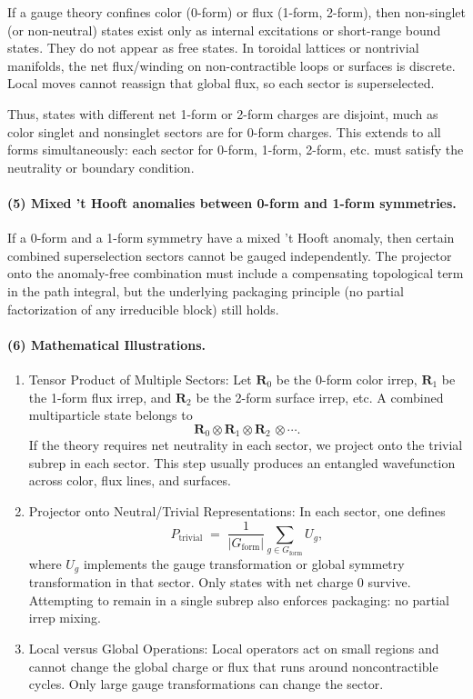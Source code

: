\documentclass[12pt,a4paper]{article}
\begin{document}
If a gauge theory confines color (0-form) or flux (1-form, 2-form),
then non-singlet (or non-neutral) states exist only as internal excitations or short-range bound states.
They do not appear as free states.
In toroidal lattices or nontrivial manifolds, the net flux/winding on non-contractible loops or surfaces is discrete.
Local moves cannot reassign that global flux, so each sector is superselected.

Thus, states with different net 1-form or 2-form charges are disjoint, much as color singlet and nonsinglet sectors are for 0-form charges.
This extends to all forms simultaneously:
each sector for 0-form, 1-form, 2-form, etc. must satisfy the neutrality or boundary condition.


\paragraph{(5) Mixed ’t Hooft anomalies between 0-form and 1-form symmetries.}
If a 0-form and a 1-form symmetry have a mixed ’t Hooft anomaly, then certain combined superselection sectors cannot be gauged independently.
The projector onto the anomaly-free combination must include a compensating topological term in the path integral, but the underlying packaging principle (no partial factorization of any irreducible block) still holds.


\paragraph{(6) Mathematical Illustrations.}

\begin{enumerate}
	\item Tensor Product of Multiple Sectors:  
	Let $\mathbf{R}_0$ be the 0-form color irrep, 
	$\mathbf{R}_1$ be the 1-form flux irrep, 
	and $\mathbf{R}_2$ be the 2-form surface irrep, etc.
	A combined multiparticle state belongs to	
	\[
	\mathbf{R}_{0}\otimes\mathbf{R}_{1}\otimes\mathbf{R}_{2}\,\otimes\cdots.
	\]
	If the theory requires net neutrality in each sector, we project onto the trivial subrep in each sector.
	This step usually produces an entangled wavefunction across color, flux lines, and surfaces.
	
	\item Projector onto Neutral/Trivial Representations:  
	In each sector, one defines
	\[
	P_{\mathrm{trivial}} \;=\; \frac{1}{\vert G_{\mathrm{form}}\vert }\sum_{g\in G_{\mathrm{form}}} U_g,
	\]
	where $U_g$ implements the gauge transformation or global symmetry transformation in that sector.
	Only states with net charge 0 survive.
	Attempting to remain in a single subrep also enforces packaging: no partial irrep mixing.
	
	\item Local versus Global Operations:  
	Local operators act on small regions and cannot change the global charge or flux that runs around noncontractible cycles.
	Only large gauge transformations can change the sector.
\end{enumerate}
\end{document}
